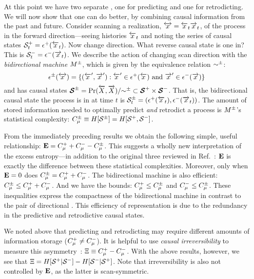\documentclass[prl,twocolumn,showpacs,superscriptaddress,preprintnumbers,floatfix]{revtex4}
\theoremstyle{plain}    \newtheorem{Lem}{Lemma}
\theoremstyle{plain}    \newtheorem*{ProLem}{Proof}
\theoremstyle{plain} 	\newtheorem{Cor}{Corollary}
\theoremstyle{plain} 	\newtheorem*{ProCor}{Proof}
\theoremstyle{plain} 	\newtheorem{The}{Theorem}
\theoremstyle{plain} 	\newtheorem*{ProThe}{Proof}
\theoremstyle{plain} 	\newtheorem{Prop}{Proposition}
\theoremstyle{plain} 	\newtheorem*{ProProp}{Proof}
\theoremstyle{plain} 	\newtheorem*{Conj}{Conjecture}
\theoremstyle{plain}	\newtheorem*{Rem}{Remark}
\theoremstyle{plain}	\newtheorem*{Def}{Definition}
\theoremstyle{plain}	\newtheorem*{Not}{Notation}
\begin{document}
At this point we have two separate \eMs, one for predicting and one for
retrodicting. We will now show that one can do better, by combining causal
information from the past and future. Consider scanning a realization,
$\overleftrightarrow {{x}} = {\overleftarrow {{x}}}_t \overrightarrow{{x}}_t$, of the process in the forward
direction---seeing histories ${\overleftarrow {{x}}}_t$ and noting the series of causal states
${\mathcal{S}}^+_t = \epsilon^+({\overleftarrow {{x}}}_t)$. Now change direction. What
reverse causal state is one in? This is
${\mathcal{S}}^-_t = \epsilon^-(\overrightarrow{{x}}_t)$. We describe the action of changing
scan direction with the \emph{bidirectional machine} ${M}^{\pm}$, which is given
by the equivalence relation ${\sim}^{\pm}$:
\begin{equation*}
\epsilon^{\pm}(\overleftrightarrow {{x}}) = \{ ({{\overleftarrow {{x}}}}^{\prime},{\overrightarrow{{x}}}^{\prime}):
  	{{\overleftarrow {{x}}}}^{\prime} \in \epsilon^+({\overleftarrow {{x}}}) ~\mathrm{and}~
	{\overrightarrow{{x}}}^{\prime} \in \epsilon^-(\overrightarrow{{x}}) \}
\end{equation*}
and has causal states ${\boldsymbol{\mathcal{S}}}^{\pm} = {\Pr}(\overleftarrow {{X}},\overrightarrow{{X}}) /
{\sim}^{\pm} \subset { \boldsymbol{ \mathcal{S} } }^+ \times { \boldsymbol{ \mathcal{S} } }^-$.
That is, the bidirectional causal state the process is in at time $t$ is
${\mathcal{S}}^{\pm}_t = (\epsilon^+({\overleftarrow {{x}}}_t),\epsilon^-(\overrightarrow{{x}}_t))$.
The amount of stored information needed to optimally predict \emph{and}
retrodict a process is ${M}^{\pm}$'s statistical complexity:
$C_\mu^{\pm} \equiv H[{\mathcal{S}}^{\pm}] = H[{\mathcal{S}}^+,{\mathcal{S}}^-]$.

From the immediately preceding results we obtain the following simple, useful
relationship: ${\bf E} = C_\mu^+ + C_\mu^- - C_\mu^{\pm}$.
This suggests a wholly new interpretation of the excess entropy---in
addition to the original three reviewed in Ref.~\cite{Crut01a}: ${\bf E}$ is
exactly the difference between these statistical complexities. Moreover,
only when ${\bf E} = 0$ does $C_\mu^{\pm} = C_\mu^+ + C_\mu^-$.
The bidirectional machine is also efficient:
$C_\mu^{\pm} \leq C_\mu^+ + C_\mu^-$.
And we have the bounds:
$C_\mu^+ \leq C_\mu^{\pm}$ and $C_\mu^- \leq C_\mu^{\pm}$.
These inequalities express the compactness of the bidirectional
machine in contrast to the pair of directional \eMs. This 
efficiency of representation is due to the redundancy in the 
predictive and retrodictive causal states.

We noted above that predicting and retrodicting may require different amounts
of information storage ($C_\mu^+ \neq C_\mu^-$). It is helpful to use
\emph{causal irreversibility} to measure this asymmetry~\cite{Crut91bc}:
$\Xi \equiv C_\mu^+ - C_\mu^-$. With the above results, however, we see that
$\Xi = H[{\mathcal{S}}^+|{\mathcal{S}}^-] -
H[{\mathcal{S}}^-|{\mathcal{S}}^+]$.
Note that irreversibility is also not controlled by ${\bf E}$, as the
latter is scan-symmetric.
\end{document}
